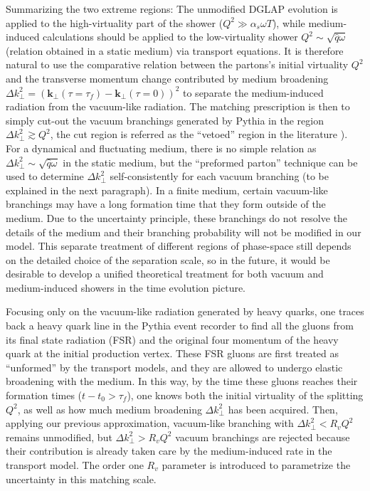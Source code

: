 Summarizing the two extreme regions:
The unmodified DGLAP evolution is applied to the high-virtuality part of the shower ($Q^2 \gg \alpha_s \omega T$), while medium-induced calculations should be applied to the low-virtuality shower $Q^2 \sim \sqrt{\hat{q}\omega}$ (relation obtained in a static medium) via transport equations.
It is therefore natural to use the comparative relation between the partons's initial virtuality $Q^2$ and the transverse momentum change contributed by medium broadening $\Delta k_\perp^2 = (\mathbf{k}_\perp(\tau=\tau_f) - \mathbf{k}_\perp(\tau=0))^2$ to separate the medium-induced radiation from the vacuum-like radiation.
The matching prescription is then to simply cut-out the vacuum branchings generated by Pythia in the region $\Delta k_\perp^2 \gtrsim Q^2$, the cut region is referred as the ``vetoed'' region in the literature \cite{PhysRevLett.120.232001}).
For a dynamical and fluctuating medium, there is no simple relation as $\Delta k_\perp^2\sim \sqrt{\hat{q}\omega}$ in the static medium, but the ``preformed parton'' technique can be used to determine $\Delta k_\perp^2$ self-consistently for each vacuum branching (to be explained in the next paragraph).
In a finite medium, certain vacuum-like branchings may have a long formation time that they form outside of the medium.
Due to the uncertainty principle, these branchings do not resolve the details of the medium and their branching probability will not be modified in our model.
This separate treatment of different regions of phase-space still depends on the detailed choice of the separation scale, so in the future, it would be desirable to develop a unified theoretical treatment for both vacuum and medium-induced showers in the time evolution picture.

Focusing only on the vacuum-like radiation generated by heavy quarks, one traces back a heavy quark line in the Pythia event recorder to find all the gluons from its final state radiation (FSR) and the original four momentum of the heavy quark at the initial production vertex.
These FSR gluons are first treated as ``unformed'' by the transport models, and they are allowed to undergo elastic broadening with the medium.
In this way, by the time these gluons reaches their formation times ($t-t_0>\tau_f$), one knows both the initial virtuality of the splitting $Q^2$, as well as how much medium broadening $\Delta k_\perp^2$ has been acquired.
Then, applying our previous approximation, vacuum-like branching with 
$\Delta k_\perp^2 < R_v Q^2$ remains unmodified, but $\Delta k_\perp^2 > R_v Q^2$ vacuum branchings are rejected because their contribution is already taken care by the medium-induced rate in the transport model.
The order one $R_v$ parameter is introduced to parametrize the uncertainty in this matching scale.

